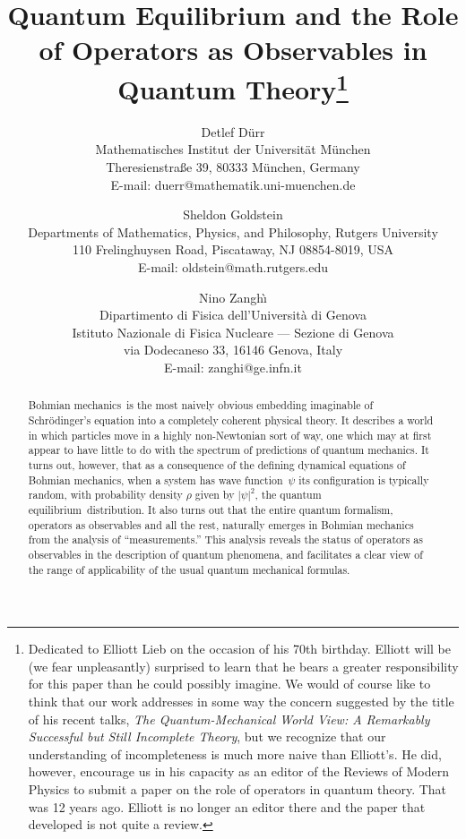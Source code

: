 \documentclass[12pt]{article}
\newcommand{\Sc}{Schr\"{o}dinger}
\newcommand{\BM}{Bohmian mechanics}
\newcommand{\qf}{quantum formalism}
\newcommand{\wf}{wave function}
\newcommand{\qe}{quantum equilibrium}
\begin{document}
\title{Quantum Equilibrium and the Role of Operators as Observables in
   Quantum Theory\footnote{Dedicated to Elliott Lieb on the occasion of
     his 70th birthday. Elliott will be (we fear unpleasantly) surprised
     to learn that he bears a greater responsibility for this paper
     than he could possibly imagine. We would of course like to think
     that our work addresses in some way the concern suggested by the
     title of his recent talks, {\it The Quantum-Mechanical World View:
       A Remarkably Successful but Still Incomplete Theory}, but we
     recognize that our understanding of incompleteness is much more
     naive than Elliott's. He did, however, encourage us in his capacity
     as an editor of the Reviews of Modern Physics to submit a paper on
     the role of operators in quantum theory.  That was 12 years ago.
     Elliott is no longer an editor there and the paper that developed
     is not quite a review.} }
\author{ Detlef  D\"{u}rr\\
   Mathematisches Institut der Universit\"{a}t M\"{u}nchen\\
   Theresienstra{\ss}e 39, 80333 M\"{u}nchen, Germany\\
   E-mail: duerr@mathematik.uni-muenchen.de \and
   Sheldon  Goldstein\\
   Departments of Mathematics, Physics, and Philosophy, Rutgers
   University\\
   110 Frelinghuysen Road, Piscataway, NJ 08854-8019, USA\\
   E-mail: oldstein@math.rutgers.edu \and
   Nino Zangh\`{\i}\\
   Dipartimento di Fisica dell'Universit\`a di Genova\\Istituto
   Nazionale di Fisica Nucleare
   --- Sezione di Genova\\
   via Dodecaneso 33, 16146 Genova, Italy\\
   E-mail: zanghi@ge.infn.it} \date{} \maketitle
\begin{abstract}
   \BM\ is the most naively obvious embedding imaginable of \Sc's
   equation into a completely coherent physical theory.  It describes a
   world in which particles move in a highly non-Newtonian sort of way,
   one which may at first appear to have little to do with the spectrum
   of predictions of quantum mechanics.  It turns out, however, that as
   a consequence of the defining dynamical equations of \BM, when a
   system has \wf\ $\psi$ its configuration is typically random, with
   probability density $\rho$ given by $|\psi|^2$, the \qe\
   distribution.  It also turns out that the entire \qf, operators as
   observables and all the rest, naturally emerges in Bohmian mechanics
   {}from the analysis of ``measurements.''  This analysis reveals the
   status of operators as observables in the description of quantum
   phenomena, and facilitates a clear view of the range of
   applicability of the usual quantum mechanical formulas.
\end{abstract}
\end{document}
